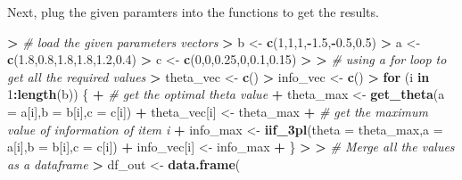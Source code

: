 \documentclass[
]{article}
\newenvironment{Shaded}{\begin{snugshade}}{\end{snugshade}}
\newcommand{\AttributeTok}[1]{\textcolor[rgb]{0.13,0.29,0.53}{#1}}
\newcommand{\CommentTok}[1]{\textcolor[rgb]{0.56,0.35,0.01}{\textit{#1}}}
\newcommand{\ControlFlowTok}[1]{\textcolor[rgb]{0.13,0.29,0.53}{\textbf{#1}}}
\newcommand{\DecValTok}[1]{\textcolor[rgb]{0.00,0.00,0.81}{#1}}
\newcommand{\ErrorTok}[1]{\textcolor[rgb]{0.64,0.00,0.00}{\textbf{#1}}}
\newcommand{\FloatTok}[1]{\textcolor[rgb]{0.00,0.00,0.81}{#1}}
\newcommand{\FunctionTok}[1]{\textcolor[rgb]{0.13,0.29,0.53}{\textbf{#1}}}
\newcommand{\NormalTok}[1]{#1}
\newcommand{\OtherTok}[1]{\textcolor[rgb]{0.56,0.35,0.01}{#1}}
\newcommand{\SpecialCharTok}[1]{\textcolor[rgb]{0.81,0.36,0.00}{\textbf{#1}}}
\begin{document}
Next, plug the given paramters into the functions to get the results.

\begin{Shaded}
\begin{Highlighting}[]
\SpecialCharTok{\textgreater{}} \CommentTok{\# load the given parameters vectors}
\ErrorTok{\textgreater{}}\NormalTok{ b }\OtherTok{\textless{}{-}} \FunctionTok{c}\NormalTok{(}\DecValTok{1}\NormalTok{,}\DecValTok{1}\NormalTok{,}\DecValTok{1}\NormalTok{,}\SpecialCharTok{{-}}\FloatTok{1.5}\NormalTok{,}\SpecialCharTok{{-}}\FloatTok{0.5}\NormalTok{,}\FloatTok{0.5}\NormalTok{)}
\SpecialCharTok{\textgreater{}}\NormalTok{ a }\OtherTok{\textless{}{-}} \FunctionTok{c}\NormalTok{(}\FloatTok{1.8}\NormalTok{,}\FloatTok{0.8}\NormalTok{,}\FloatTok{1.8}\NormalTok{,}\FloatTok{1.8}\NormalTok{,}\FloatTok{1.2}\NormalTok{,}\FloatTok{0.4}\NormalTok{)}
\SpecialCharTok{\textgreater{}}\NormalTok{ c }\OtherTok{\textless{}{-}} \FunctionTok{c}\NormalTok{(}\DecValTok{0}\NormalTok{,}\DecValTok{0}\NormalTok{,}\FloatTok{0.25}\NormalTok{,}\DecValTok{0}\NormalTok{,}\FloatTok{0.1}\NormalTok{,}\FloatTok{0.15}\NormalTok{)}
\SpecialCharTok{\textgreater{}} 
\ErrorTok{\textgreater{}} \CommentTok{\# using a for loop to get all the required values}
\ErrorTok{\textgreater{}}\NormalTok{ theta\_vec }\OtherTok{\textless{}{-}} \FunctionTok{c}\NormalTok{()}
\SpecialCharTok{\textgreater{}}\NormalTok{ info\_vec }\OtherTok{\textless{}{-}} \FunctionTok{c}\NormalTok{()}
\SpecialCharTok{\textgreater{}} \ControlFlowTok{for}\NormalTok{ (i }\ControlFlowTok{in} \DecValTok{1}\SpecialCharTok{:}\FunctionTok{length}\NormalTok{(b)) \{}
\SpecialCharTok{+}   \CommentTok{\# get the optimal theta value}
\SpecialCharTok{+}\NormalTok{   theta\_max }\OtherTok{\textless{}{-}} \FunctionTok{get\_theta}\NormalTok{(}\AttributeTok{a =}\NormalTok{ a[i],}\AttributeTok{b =}\NormalTok{ b[i],}\AttributeTok{c =}\NormalTok{ c[i])}
\SpecialCharTok{+}\NormalTok{   theta\_vec[i] }\OtherTok{\textless{}{-}}\NormalTok{ theta\_max}
\SpecialCharTok{+}   \CommentTok{\# get the maximum value of information of item i}
\SpecialCharTok{+}\NormalTok{   info\_max }\OtherTok{\textless{}{-}} \FunctionTok{iif\_3pl}\NormalTok{(}\AttributeTok{theta =}\NormalTok{ theta\_max,}\AttributeTok{a =}\NormalTok{ a[i],}\AttributeTok{b =}\NormalTok{ b[i],}\AttributeTok{c =}\NormalTok{ c[i])}
\SpecialCharTok{+}\NormalTok{   info\_vec[i] }\OtherTok{\textless{}{-}}\NormalTok{ info\_max}
\SpecialCharTok{+}\NormalTok{ \}}
\SpecialCharTok{\textgreater{}} 
\ErrorTok{\textgreater{}} \CommentTok{\# Merge all the values as a dataframe}
\ErrorTok{\textgreater{}}\NormalTok{ df\_out }\OtherTok{\textless{}{-}} \FunctionTok{data.frame}\NormalTok{(}

\end{Highlighting}
\end{Shaded}
\end{document}
